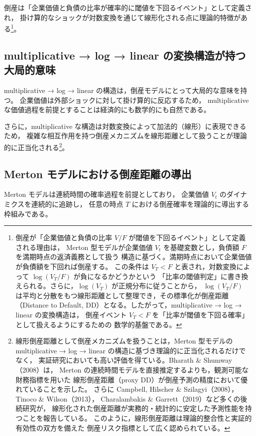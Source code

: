 倒産は「企業価値と負債の比率が確率的に閾値を下回るイベント」として定義され，
掛け算的なショックが対数変換を通じて線形化される点に理論的特徴がある\footnote{
倒産が「企業価値と負債の比率 $V/F$ が閾値を下回るイベント」として定義される理由は，
Merton 型モデルが企業価値 $V_t$ を基礎変数とし，負債額 $F$ を満期時点の返済義務として扱う
構造に基づく。満期時点において企業価値が負債額を下回れば倒産する。
この条件は $V_T < F$ と表され，対数変換によって $\log(V_T/F)$ が負になるかどうかという
「比率の閾値判定」に書き換えられる。さらに，$\log(V_T)$ が正規分布に従うことから，
$\log(V_T/F)$ は平均と分散をもつ線形距離として整理でき，その標準化が倒産距離
（Distance to Default, DD）となる。したがって，multiplicative → log → linear の変換構造は，
倒産イベント $V_T < F$ を「比率が閾値を下回る確率」として扱えるようにするための
数学的基盤である。
}。

\subsection{multiplicative → log → linear の変換構造が持つ大局的意味}

multiplicative → log → linear の構造は，倒産モデルにとって大局的な意味を持つ。
企業価値は外部ショックに対して掛け算的に反応するため，
multiplicative な価値過程を前提とすることは経済的にも数学的にも自然である。

さらに，multiplicative な構造は対数変換によって加法的（線形）に表現できるため，
複雑な相互作用を持つ倒産メカニズムを線形距離として扱うことが理論的に正当化される\footnote{
線形倒産距離として倒産メカニズムを扱うことは，Merton 型モデルの
multiplicative → log → linear の構造に基づき理論的に正当化されるだけでなく，
実証研究においても高い評価を得ている。Bharath \& Shumway（2008）は，
Merton の連続時間モデルを直接推定するよりも，観測可能な財務指標を用いた
線形倒産距離（proxy DD）が倒産予測の精度において優れていることを示した。
さらに Campbell, Hilscher \& Szilagyi（2008），Tinoco \& Wilson（2013），
Charalambakis \& Garrett（2019）など多くの後続研究が，
線形化された倒産距離が実務的・統計的に安定した予測性能を持つことを報告している。
このように，線形倒産距離は理論的整合性と実証的有効性の双方を備えた
倒産リスク指標として広く認められている。
}。

\subsection{Merton モデルにおける倒産距離の導出}

Merton モデルは連続時間の確率過程を前提としており，
企業価値 $V_t$ のダイナミクスを連続的に追跡し，
任意の時点 $T$ における倒産確率を理論的に導出する枠組みである。

